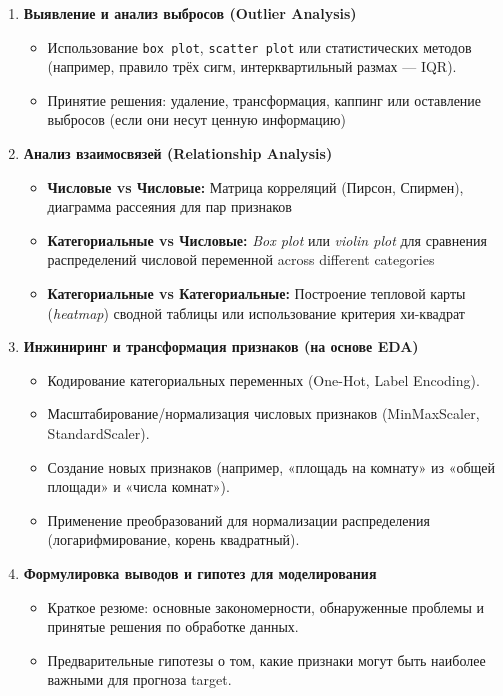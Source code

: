 \begin{enumerate}
    \item \textbf{Выявление и анализ выбросов (Outlier Analysis)}
    
    \begin{itemize}
        \item Использование \texttt{box plot}, \texttt{scatter plot} или статистических методов (например,
        правило трёх сигм, интерквартильный размах — IQR).
        \item Принятие решения: удаление, трансформация, каппинг или оставление выбросов (если они несут ценную
        информацию)
    \end{itemize}
    
    \item \textbf{Анализ взаимосвязей (Relationship Analysis)}
    \begin{itemize}
        \item \textbf{Числовые vs Числовые:} Матрица корреляций (Пирсон, Спирмен), диаграмма рассеяния для пар признаков
        \item \textbf{Категориальные vs Числовые:} \textit{Box plot} или \textit{violin plot} для сравнения
        распределений числовой переменной across different categories
        \item \textbf{Категориальные vs Категориальные:} Построение тепловой карты (\textit{heatmap}) сводной
        таблицы или использование критерия хи-квадрат
    \end{itemize}
    
    \item \textbf{Инжиниринг и трансформация признаков (на основе EDA)}
    
    \begin{itemize}
        \item Кодирование категориальных переменных (One-Hot, Label Encoding).
        \item Масштабирование/нормализация числовых признаков (MinMaxScaler, StandardScaler).
        \item Создание новых признаков (например, «площадь на комнату» из «общей площади» и «числа комнат»).
        \item Применение преобразований для нормализации распределения (логарифмирование, корень квадратный).
    \end{itemize}
    
    \item \textbf{Формулировка выводов и гипотез для моделирования}
    \begin{itemize}
        \item Краткое резюме: основные закономерности, обнаруженные проблемы и принятые решения по обработке данных.
        \item Предварительные гипотезы о том, какие признаки могут быть наиболее важными для прогноза target.
    \end{itemize}

\end{enumerate}